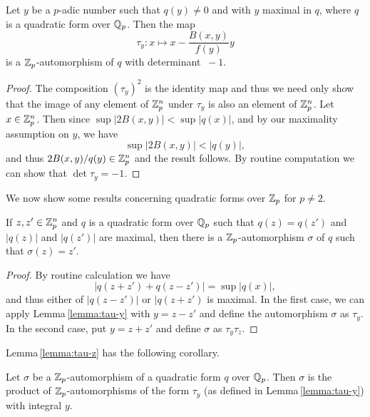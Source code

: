 \begin{lemmax}\label{lemma:tau-y}
    Let \(y\) be a \(p\)-adic number such that \(q(y) \neq 0\) and with \(y\) maximal in \(q\), where \(q\) is a quadratic form over \(\mathbb{Q}_p\). Then the map
    \[
       \tau_y : x \mapsto x - \frac{B(x,y)}{f(y)}y
    \]
    is a \(\mathbb{Z}_p\)-automorphism of \(q\) with determinant \(\ -1\).
\end{lemmax}

\begin{proof}
    The composition \((\tau_y)^2\) is the identity map and thus we need only show that the image of any element of \(\mathbb{Z}_p^n\) under \(\tau_y\) is also an element of \(\mathbb{Z}_p^n\). Let \(x \in \mathbb{Z}_p^n\). Then since \(\sup |2B(x, y)| < \sup |q(x)|\), and by our maximality assumption on \(y\), we have
    \[
        \sup |2B(x, y)| < |q(y)|,
    \]
    and thus \(2B(x, y)/q(y) \in \mathbb{Z}_p^n\) and the result follows. By routine computation we can show that \(\det \tau_y = -1\).
\end{proof}

We now show some results concerning quadratic forms over \(\mathbb{Z}_p\) for \(p \neq 2\).

\begin{lemmax}\label{lemma:tau-z}
    If \(z, z' \in \mathbb{Z}_p^n\) and \(q\) is a quadratic form over \(\mathbb{Q}_p\) such that \(q(z) = q(z')\) and \(|q(z)|\) and \(|q(z')|\) are maximal, then there is a \(\mathbb{Z}_p\)-automorphism \(\sigma\) of \(q\) such that \(\sigma(z) = z'\).
\end{lemmax}

\begin{proof}
    By routine calculation we have
    \[
        |q(z + z') + q(z - z')| = \sup |q(x)|,
    \]
    and thus either of \(|q(z - z')|\) or \(|q(z + z')\) is maximal. In the first case, we can apply Lemma\,\ref{lemma:tau-y} with \(y = z - z'\) and define the automorphism \(\sigma\) as \(\tau_y\). In the second case, put \(y = z + z'\) and define \(\sigma\) as \(\tau_y\tau_{z}\).
\end{proof}

\medskip

Lemma\,\ref{lemma:tau-z} has the following corollary.

\begin{corollary}
    Let \(\sigma\) be a \(\mathbb{Z}_p\)-automorphism of a quadratic form \(q\) over \(\mathbb{Q}_p\). Then \(\sigma\) is the product of \(\mathbb{Z}_p\)-automorphisms of the form \(\tau_y\) (as defined in Lemma\,\ref{lemma:tau-y}) with integral \(y\).
\end{corollary}

